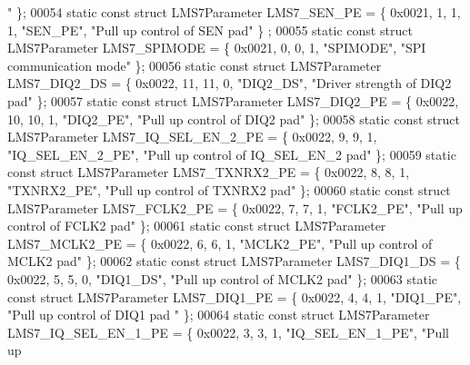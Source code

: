 \begin{DoxyCode}
{      "} \};
00054 \textcolor{keyword}{static} \textcolor{keyword}{const} \textcolor{keyword}{struct }LMS7Parameter LMS7_SEN_PE = \{ 0x0021, 1, 1, 1, \textcolor{stringliteral}{"SEN\_PE"}, \textcolor{stringliteral}{"Pull up control of SEN pad"} \}
      ;
00055 \textcolor{keyword}{static} \textcolor{keyword}{const} \textcolor{keyword}{struct }LMS7Parameter LMS7_SPIMODE = \{ 0x0021, 0, 0, 1, \textcolor{stringliteral}{"SPIMODE"}, \textcolor{stringliteral}{"SPI communication mode"} \};
00056 \textcolor{keyword}{static} \textcolor{keyword}{const} \textcolor{keyword}{struct }LMS7Parameter LMS7_DIQ2_DS = \{ 0x0022, 11, 11, 0, \textcolor{stringliteral}{"DIQ2\_DS"}, \textcolor{stringliteral}{"Driver strength of DIQ2
       pad"} \};
00057 \textcolor{keyword}{static} \textcolor{keyword}{const} \textcolor{keyword}{struct }LMS7Parameter LMS7_DIQ2_PE = \{ 0x0022, 10, 10, 1, \textcolor{stringliteral}{"DIQ2\_PE"}, \textcolor{stringliteral}{"Pull up control of DIQ2
       pad"} \};
00058 \textcolor{keyword}{static} \textcolor{keyword}{const} \textcolor{keyword}{struct }LMS7Parameter LMS7_IQ_SEL_EN_2_PE = \{ 0x0022, 9, 9, 1, \textcolor{stringliteral}{"IQ\_SEL\_EN\_2\_PE"}, \textcolor{stringliteral}{"Pull up
       control of IQ\_SEL\_EN\_2 pad"} \};
00059 \textcolor{keyword}{static} \textcolor{keyword}{const} \textcolor{keyword}{struct }LMS7Parameter LMS7_TXNRX2_PE = \{ 0x0022, 8, 8, 1, \textcolor{stringliteral}{"TXNRX2\_PE"}, \textcolor{stringliteral}{"Pull up control of
       TXNRX2 pad"} \};
00060 \textcolor{keyword}{static} \textcolor{keyword}{const} \textcolor{keyword}{struct }LMS7Parameter LMS7_FCLK2_PE = \{ 0x0022, 7, 7, 1, \textcolor{stringliteral}{"FCLK2\_PE"}, \textcolor{stringliteral}{"Pull up control of FCLK2
       pad"} \};
00061 \textcolor{keyword}{static} \textcolor{keyword}{const} \textcolor{keyword}{struct }LMS7Parameter LMS7_MCLK2_PE = \{ 0x0022, 6, 6, 1, \textcolor{stringliteral}{"MCLK2\_PE"}, \textcolor{stringliteral}{"Pull up control of MCLK2
       pad"} \};
00062 \textcolor{keyword}{static} \textcolor{keyword}{const} \textcolor{keyword}{struct }LMS7Parameter LMS7_DIQ1_DS = \{ 0x0022, 5, 5, 0, \textcolor{stringliteral}{"DIQ1\_DS"}, \textcolor{stringliteral}{"Pull up control of MCLK2
       pad"} \};
00063 \textcolor{keyword}{static} \textcolor{keyword}{const} \textcolor{keyword}{struct }LMS7Parameter LMS7_DIQ1_PE = \{ 0x0022, 4, 4, 1, \textcolor{stringliteral}{"DIQ1\_PE"}, \textcolor{stringliteral}{"Pull up control of DIQ1 pad
      "} \};
00064 \textcolor{keyword}{static} \textcolor{keyword}{const} \textcolor{keyword}{struct }LMS7Parameter LMS7_IQ_SEL_EN_1_PE = \{ 0x0022, 3, 3, 1, \textcolor{stringliteral}{"IQ\_SEL\_EN\_1\_PE"}, \textcolor{stringliteral}{"Pull up
}
\end{DoxyCode}
